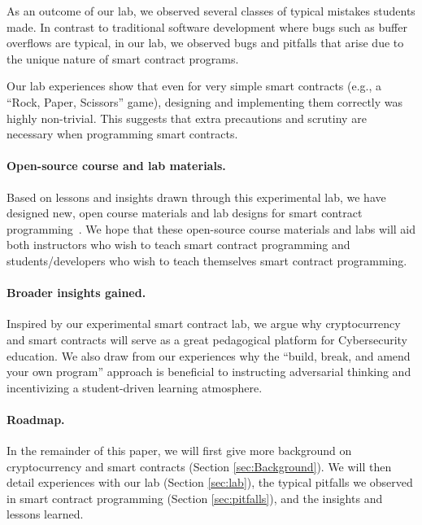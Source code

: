 \documentclass{llncs}
\newcommand{\elaine}[1]{}
\begin{document}


As an outcome of our lab, we observed several classes
of typical mistakes students made. 
In contrast to  
traditional software development where 
bugs such as buffer overflows are typical, 
in our lab, we observed 
bugs and pitfalls that arise due to 
the unique nature of smart contract programs.

Our lab experiences show that even for 
very simple smart contracts (e.g., a 
``Rock, Paper, Scissors'' game), 
designing and implementing them correctly
was highly non-trivial.
This suggests that extra precautions 
and scrutiny 
are necessary when programming smart contracts.





\paragraph{Open-source course and lab materials.}
Based on lessons and insights 
drawn through this experimental lab, we have designed
new, open course materials and lab designs 
for smart contract programming~\cite{anonymousethlab}.
We hope that these open-source course materials and labs
will aid both instructors who 
wish to teach smart contract programming and students/developers who 
wish to teach themselves smart contract programming.
\elaine{probably the langugage can be better.}

\paragraph{Broader insights gained.}
Inspired by our experimental 
smart contract lab, 
we argue why cryptocurrency and smart contracts 
will serve as a great pedagogical platform 
for Cybersecurity education.
We also draw from our experiences
why the ``build, break, and amend your own program'' 
approach is beneficial to instructing adversarial thinking
and incentivizing a student-driven learning 
atmosphere.

\paragraph{Roadmap.}
In the remainder of this paper, we will first give more background on 
cryptocurrency and smart contracts (Section \ref{sec:Background}). 
We will then detail experiences with our lab (Section \ref{sec:lab}),  
the typical pitfalls we observed in smart  
contract programming (Section \ref{sec:pitfalls}), 
and the insights and lessons learned. 
\end{document}

